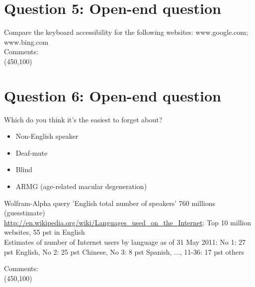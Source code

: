 \documentclass[12pt,a4paper,norsk]{article}
\begin{document}
\section {Question 5: Open-end question} Compare the keyboard accessibility for the following websites:
www.google.com; www.bing.com \\

\noindent Comments:\\
\framebox(450,100){}\\

\section {Question 6: Open-end question} Which do you think it’s the easiest to forget about?

\begin{itemize}
 \item Non-English speaker
 \item Deaf-mute
 \item Blind
 \item ARMG (age-related macular degeneration)
\end{itemize}

Wolfram-Alpha query 'English total number of speakers' 760 millions (guesstimate) \\
\url{http://en.wikipedia.org/wiki/Languages_used_on_the_Internet}: Top 10 million websites, 55 pst in English \\
Estimates of number of Internet users by language as of 31 May 2011: No 1: 27 pst English, No 2: 25 pst Chinese, No 3: 8 pst Spanish, ..., 11-36: 17 pst others


\noindent Comments:\\
\framebox(450,100){}\\
\end{document}
